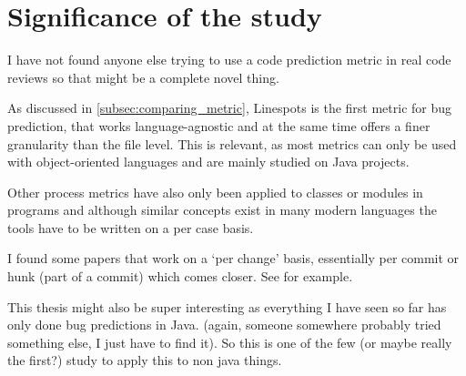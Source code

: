 \section{Significance of the study}

I have not found anyone else trying to use a code prediction metric in real code reviews
so that might be a complete novel thing. %

As discussed in \ref{subsec:comparing_metric}, Linespots is the first metric for bug prediction, that works language-agnostic and at the same time offers a finer granularity than the file level. This is relevant, as most metrics can only be used with object-oriented languages and are mainly studied on Java projects. %

Other process metrics have also only been applied to classes or modules in programs and although similar concepts exist in many modern languages the tools have to be written on a per case basis.

I found some papers that work on a `per change' basis, essentially per commit or hunk (part of a commit) which comes closer. See \cite{5431727} for example.

This thesis might also be super interesting as everything I have seen so far has only done bug predictions in Java. (again, someone somewhere probably tried something else, I just have to find it). So this is one of the few (or maybe really the first?) study to apply this to non java things.

